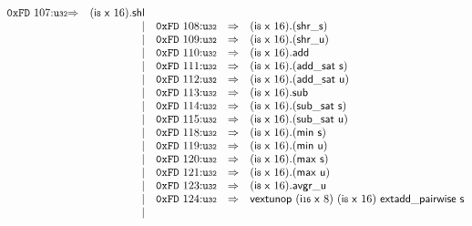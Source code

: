 $$\begin{array}{@{}l@{}rrlll@{}l@{}}
\mathtt{0xFD}~107{:}{\mathtt{u{\scriptstyle32}}} &\Rightarrow& (\mathsf{i{\scriptstyle8}}~\mathsf{x}~16) . \mathsf{shl} \\ &&|&
\mathtt{0xFD}~108{:}{\mathtt{u{\scriptstyle32}}} &\Rightarrow& (\mathsf{i{\scriptstyle8}}~\mathsf{x}~16) . ({\mathsf{shr\_}}{\mathsf{s}}) \\ &&|&
\mathtt{0xFD}~109{:}{\mathtt{u{\scriptstyle32}}} &\Rightarrow& (\mathsf{i{\scriptstyle8}}~\mathsf{x}~16) . ({\mathsf{shr\_}}{\mathsf{u}}) \\ &&|&
\mathtt{0xFD}~110{:}{\mathtt{u{\scriptstyle32}}} &\Rightarrow& (\mathsf{i{\scriptstyle8}}~\mathsf{x}~16) . \mathsf{add} \\ &&|&
\mathtt{0xFD}~111{:}{\mathtt{u{\scriptstyle32}}} &\Rightarrow& (\mathsf{i{\scriptstyle8}}~\mathsf{x}~16) . (\mathsf{add\_sat}~\mathsf{s}) \\ &&|&
\mathtt{0xFD}~112{:}{\mathtt{u{\scriptstyle32}}} &\Rightarrow& (\mathsf{i{\scriptstyle8}}~\mathsf{x}~16) . (\mathsf{add\_sat}~\mathsf{u}) \\ &&|&
\mathtt{0xFD}~113{:}{\mathtt{u{\scriptstyle32}}} &\Rightarrow& (\mathsf{i{\scriptstyle8}}~\mathsf{x}~16) . \mathsf{sub} \\ &&|&
\mathtt{0xFD}~114{:}{\mathtt{u{\scriptstyle32}}} &\Rightarrow& (\mathsf{i{\scriptstyle8}}~\mathsf{x}~16) . (\mathsf{sub\_sat}~\mathsf{s}) \\ &&|&
\mathtt{0xFD}~115{:}{\mathtt{u{\scriptstyle32}}} &\Rightarrow& (\mathsf{i{\scriptstyle8}}~\mathsf{x}~16) . (\mathsf{sub\_sat}~\mathsf{u}) \\ &&|&
\mathtt{0xFD}~118{:}{\mathtt{u{\scriptstyle32}}} &\Rightarrow& (\mathsf{i{\scriptstyle8}}~\mathsf{x}~16) . (\mathsf{min}~\mathsf{s}) \\ &&|&
\mathtt{0xFD}~119{:}{\mathtt{u{\scriptstyle32}}} &\Rightarrow& (\mathsf{i{\scriptstyle8}}~\mathsf{x}~16) . (\mathsf{min}~\mathsf{u}) \\ &&|&
\mathtt{0xFD}~120{:}{\mathtt{u{\scriptstyle32}}} &\Rightarrow& (\mathsf{i{\scriptstyle8}}~\mathsf{x}~16) . (\mathsf{max}~\mathsf{s}) \\ &&|&
\mathtt{0xFD}~121{:}{\mathtt{u{\scriptstyle32}}} &\Rightarrow& (\mathsf{i{\scriptstyle8}}~\mathsf{x}~16) . (\mathsf{max}~\mathsf{u}) \\ &&|&
\mathtt{0xFD}~123{:}{\mathtt{u{\scriptstyle32}}} &\Rightarrow& (\mathsf{i{\scriptstyle8}}~\mathsf{x}~16) . \mathsf{avgr\_u} \\ &&|&
\mathtt{0xFD}~124{:}{\mathtt{u{\scriptstyle32}}} &\Rightarrow& \mathsf{vextunop}~(\mathsf{i{\scriptstyle16}}~\mathsf{x}~8)~(\mathsf{i{\scriptstyle8}}~\mathsf{x}~16)~\mathsf{extadd\_pairwise}~\mathsf{s} \\ &&|&

\end{array}$$
